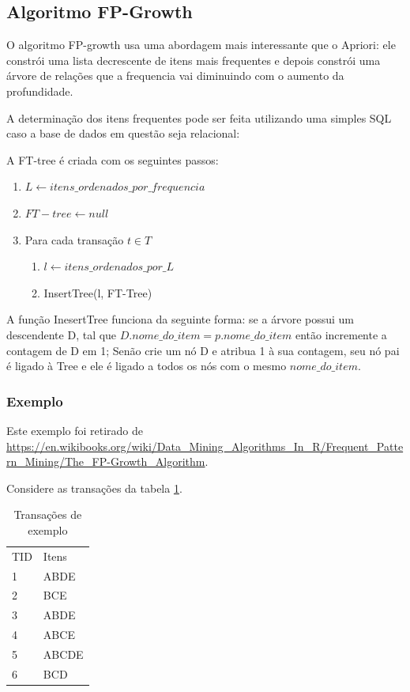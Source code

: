 \documentclass[12pt]{article}
\begin{document}
\subsection{Algoritmo FP-Growth}

O algoritmo FP-growth usa uma abordagem mais interessante que o Apriori: ele
constrói uma lista decrescente de itens mais frequentes e depois constrói uma
árvore de relações que a frequencia vai diminuindo com o aumento da
profundidade.

A determinação dos itens frequentes pode ser feita utilizando uma simples SQL
caso a base de dados em questão seja relacional:

 

A FT-tree é criada com os seguintes passos:

\begin{enumerate}
    \item $L \leftarrow itens\_ordenados\_por\_frequencia$
    \item $FT-tree \leftarrow null$
    \item Para cada transação $t \in T$
        \begin{enumerate}
            \item $l \leftarrow itens\_ordenados\_por\_L$
            \item InsertTree(l, FT-Tree)
        \end{enumerate}
\end{enumerate}

A função InesertTree funciona da seguinte forma: se a árvore possui um
descendente D, tal que $D.nome\_do\_item = p.nome\_do\_item$ então incremente a
contagem de D em 1; Senão crie um nó D e atribua 1 à sua contagem, seu nó pai é
ligado à Tree e ele é ligado a todos os nós com o mesmo $nome\_do\_item$. 

\subsubsection{Exemplo}

Este exemplo foi retirado de \url{https://en.wikibooks.org/wiki/Data\_Mining\_Algorithms\_In\_R/Frequent\_Pattern\_Mining/The\_FP-Growth\_Algorithm}.

Considere as transações da tabela \ref{tbl:exemplo}.

\begin{table}[H]
\centering
\caption{Transações de exemplo}
\label{tbl:exemplo}
\begin{tabular}{ll}
TID & Itens \\
1   & ABDE  \\
2   & BCE   \\
3   & ABDE  \\
4   & ABCE  \\
5   & ABCDE \\
6   & BCD  
\end{tabular}
\end{table}
\end{document}
